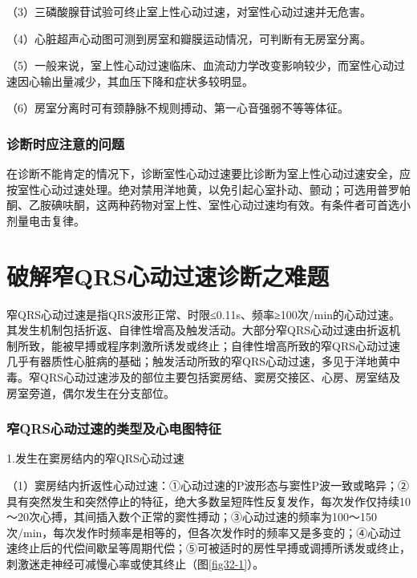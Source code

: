 （3）三磷酸腺苷试验可终止室上性心动过速，对室性心动过速并无危害。

（4）心脏超声心动图可测到房室和瓣膜运动情况，可判断有无房室分离。

（5）一般来说，室上性心动过速临床、血流动力学改变影响较少，而室性心动过速因心输出量减少，其血压下降和症状多较明显。

（6）房室分离时可有颈静脉不规则搏动、第一心音强弱不等等体征。

\protect\hypertarget{text00038.htmlux5cux23subid439}{}{}

\subsection{诊断时应注意的问题}

在诊断不能肯定的情况下，诊断室性心动过速要比诊断为室上性心动过速安全，应按室性心动过速处理。绝对禁用洋地黄，以免引起心室扑动、颤动；可选用普罗帕酮、乙胺碘呋酮，这两种药物对室上性、室性心动过速均有效。有条件者可首选小剂量电击复律。

\protect\hypertarget{text00039.html}{}{}

\protect\hypertarget{text00039.htmlux5cux23chapter39}{}{}

\chapter{破解窄QRS心动过速诊断之难题}

窄QRS心动过速是指QRS波形正常、时限≤0.11s、频率≥100次/min的心动过速。其发生机制包括折返、自律性增高及触发活动。大部分窄QRS心动过速由折返机制所致，能被早搏或程序刺激所诱发或终止；自律性增高所致的窄QRS心动过速几乎有器质性心脏病的基础；触发活动所致的窄QRS心动过速，多见于洋地黄中毒。窄QRS心动过速涉及的部位主要包括窦房结、窦房交接区、心房、房室结及房室旁道，偶尔发生在分支部位。

\protect\hypertarget{text00039.htmlux5cux23subid440}{}{}

\subsection{窄QRS心动过速的类型及心电图特征}

1.发生在窦房结内的窄QRS心动过速

（1）窦房结内折返性心动过速：①心动过速的P波形态与窦性P波一致或略异；②具有突然发生和突然停止的特征，绝大多数呈短阵性反复发作，每次发作仅持续10～20次心搏，其间插入数个正常的窦性搏动；③心动过速的频率为100～150次/min，每次发作时频率是相等的，但各次发作时的频率又是多变的；④心动过速终止后的代偿间歇呈等周期代偿；⑤可被适时的房性早搏或调搏所诱发或终止，刺激迷走神经可减慢心率或使其终止（图\ref{fig32-1}）。

